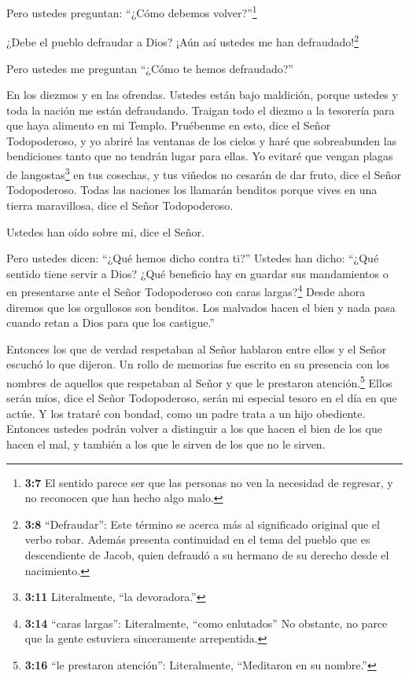 Pero ustedes preguntan: ``¿Cómo debemos volver?''\footnote{\textbf{3:7}
  El sentido parece ser que las personas no ven la necesidad de
  regresar, y no reconocen que han hecho algo malo.}

 ¿Debe el pueblo defraudar a Dios? ¡Aún así ustedes me han
defraudado!\footnote{\textbf{3:8} ``Defraudar'': Este término se acerca
  más al significado original que el verbo robar. Además presenta
  continuidad en el tema del pueblo que es descendiente de Jacob, quien
  defraudó a su hermano de su derecho desde el nacimiento.}

Pero ustedes me preguntan ``¿Cómo te hemos defraudado?''

En los diezmos y en las ofrendas.  Ustedes están bajo
maldición, porque ustedes y toda la nación me están defraudando.
 Traigan todo el diezmo a la tesorería para que haya
alimento en mi Templo. Pruébenme en esto, dice el Señor Todopoderoso, y
yo abriré las ventanas de los cielos y haré que sobreabunden las
bendiciones tanto que no tendrán lugar para ellas.  Yo
evitaré que vengan plagas de langostas\footnote{\textbf{3:11}
  Literalmente, ``la devoradora.''} en tus cosechas, y tus viñedos no
cesarán de dar fruto, dice el Señor Todopoderoso.  Todas
las naciones los llamarán benditos porque vives en una tierra
maravillosa, dice el Señor Todopoderoso.

 Ustedes han oído sobre mi, dice el Señor.

Pero ustedes dicen: ``¿Qué hemos dicho contra ti?'' 
Ustedes han dicho: ``¿Qué sentido tiene servir a Dios? ¿Qué beneficio
hay en guardar sus mandamientos o en presentarse ante el Señor
Todopoderoso con caras largas?\footnote{\textbf{3:14} ``caras largas'':
  Literalmente, ``como enlutados'' No obstante, no parce que la gente
  estuviera sinceramente arrepentida.}  Desde ahora diremos
que los orgullosos son benditos. Los malvados hacen el bien y nada pasa
cuando retan a Dios para que los castigue.''

 Entonces los que de verdad respetaban al Señor hablaron
entre ellos y el Señor escuchó lo que dijeron. Un rollo de memorias fue
escrito en su presencia con los nombres de aquellos que respetaban al
Señor y que le prestaron atención.\footnote{\textbf{3:16} ``le prestaron
  atención'': Literalmente, ``Meditaron en su nombre.''} 
Ellos serán míos, dice el Señor Todopoderoso, serán mi especial tesoro
en el día en que actúe. Y los trataré con bondad, como un padre trata a
un hijo obediente.  Entonces ustedes podrán volver a
distinguir a los que hacen el bien de los que hacen el mal, y también a
los que le sirven de los que no le sirven.

